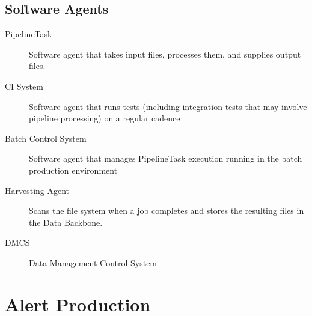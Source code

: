 \documentclass[DM,toc,lsstdraft]{lsstdoc}
\begin{document}
\subsection{Software Agents}

\begin{description}
\item[PipelineTask] Software agent that takes input files, processes them, and supplies output files.
\item[CI System] Software agent that runs tests (including integration tests that may involve pipeline processing) on a regular cadence
\item[Batch Control System] Software agent that manages PipelineTask execution running in the batch production environment
\item[Harvesting Agent] Scans the file system when a job completes and stores the resulting files in the Data Backbone.
\item[DMCS] Data Management Control System
\end{description}

\section{Alert Production}
\end{document}
